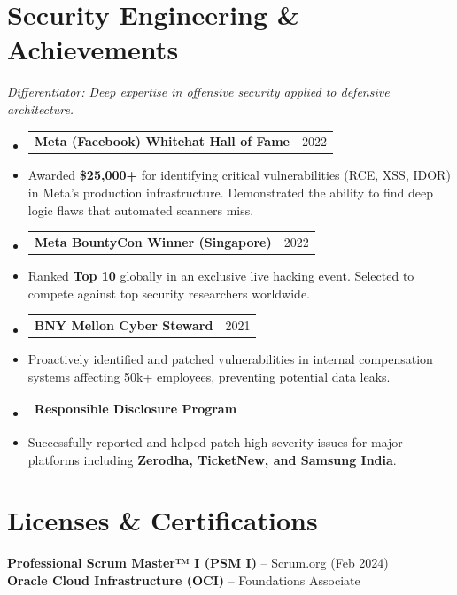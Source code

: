 \documentclass[letterpaper,11pt]{article}
\makeatletter
\newcommand{\resumeItem}[1]{
  \item\small{
    {#1 \vspace{3pt}} %
  }
}
\newcommand{\resumeProjectHeading}[2]{
    \item
    \begin{tabular*}{0.97\textwidth}{l@{\extracolsep{\fill}}r}
      \small#1 & #2 \\
    \end{tabular*}\vspace{-5pt}
}
\newcommand{\resumeSubHeadingListStart}{\begin{itemize}[leftmargin=0.15in, label={}]}
\newcommand{\resumeSubHeadingListEnd}{\end{itemize}}
\makeatother
\begin{document}
\section{Security Engineering \& Achievements}
\textit{\small Differentiator: Deep expertise in offensive security applied to defensive architecture.}
  \resumeSubHeadingListStart
    \resumeProjectHeading
        {\textbf{Meta (Facebook) Whitehat Hall of Fame}}{2022}
        \resumeItem{Awarded \textbf{\$25,000+} for identifying critical vulnerabilities (RCE, XSS, IDOR) in Meta's production infrastructure. Demonstrated the ability to find deep logic flaws that automated scanners miss.}
    \resumeProjectHeading
        {\textbf{Meta BountyCon Winner (Singapore)}}{2022}
        \resumeItem{Ranked \textbf{Top 10} globally in an exclusive live hacking event. Selected to compete against top security researchers worldwide.}
    \resumeProjectHeading
        {\textbf{BNY Mellon Cyber Steward}}{2021}
        \resumeItem{Proactively identified and patched vulnerabilities in internal compensation systems affecting 50k+ employees, preventing potential data leaks.}
    \resumeProjectHeading
        {\textbf{Responsible Disclosure Program}}{}
        \resumeItem{Successfully reported and helped patch high-severity issues for major platforms including \textbf{Zerodha, TicketNew, and Samsung India}.}
  \resumeSubHeadingListEnd


\section{Licenses \& Certifications}
 \begin{itemize}[leftmargin=0.15in, label={}]
    \small{\item{
     \textbf{Professional Scrum Master™ I (PSM I)} -- Scrum.org (Feb 2024) \\
     \textbf{Oracle Cloud Infrastructure (OCI)} -- Foundations Associate
    }}
 \end{itemize}


\end{document}
